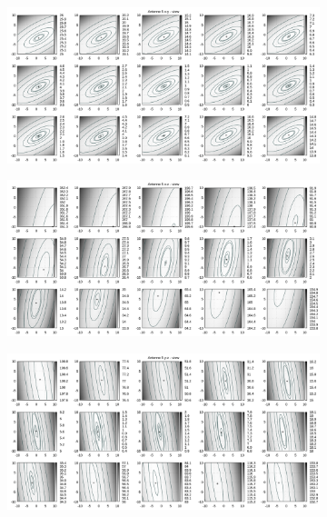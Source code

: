 \begin{appendix}
\begin{figure}[!ht]
\begin{subfigure}[t]{0.3\textwidth}
	\end{subfigure}
\\
	\centering
	\begin{subfigure}[t]{0.3\textwidth}
	     \centering
	     \includegraphics[width=\textwidth]{img/fitness/xy/a5.png}
	\end{subfigure}
	\begin{subfigure}[t]{0.3\textwidth}
		\centering
	     \includegraphics[width=\textwidth]{img/fitness/xz/a5.png}
	\end{subfigure}
	\begin{subfigure}[t]{0.3\textwidth}
			\centering
	   \includegraphics[width=\textwidth]{img/fitness/yz/a5.png}

\end{subfigure}
\end{figure}
\end{appendix}
